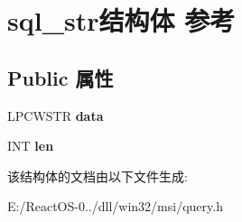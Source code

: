 \hypertarget{structsql__str}{}\section{sql\+\_\+str结构体 参考}
\label{structsql__str}
\subsection*{Public 属性}
\begin{DoxyCompactItemize}
\item 
\mbox{\label{structsql__str_a0b39a270bd745e68f9938995e7211942}} 
L\+P\+C\+W\+S\+TR {\bfseries data}
\item 
\mbox{\label{structsql__str_a661cafec5095cd2dbaa177f7b5f5daae}} 
I\+NT {\bfseries len}
\end{DoxyCompactItemize}


该结构体的文档由以下文件生成\+:\begin{DoxyCompactItemize}
\item 
E\+:/\+React\+O\+S-\/0../dll/win32/msi/query.\+h\end{DoxyCompactItemize}
